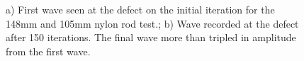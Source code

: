  
  \begin{figure}
 \begin{subfigmatrix}{2}
 \end{subfigmatrix}
 
    \caption
    { \label{fig:nylonExp1}
    a) First wave seen at the defect on the initial iteration for the 148mm and 105mm nylon rod test.; b) Wave recorded at the defect after 150 iterations. The final wave more than tripled in amplitude from the first wave.
  }
 \end{figure}
 
